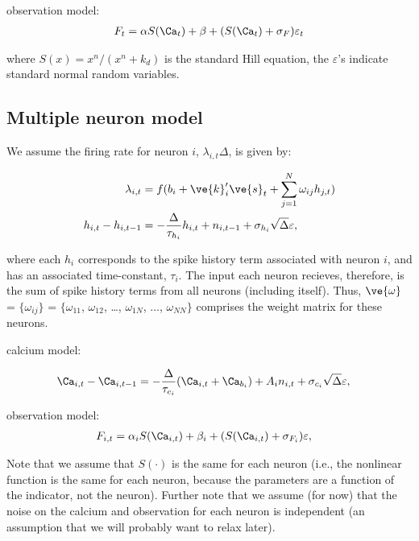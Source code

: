 \documentclass[12pt]{article}
\begin{document}
observation model:
\begin{align} \label{eq:1obs}
F_t = \alpha S(\Ca_t) + \beta + (S(\Ca_t)+\sigma_F) \varepsilon_t
\end{align} 

\noindent where $S(x)=x^n/(x^n+k_d)$ is the standard Hill equation,  the $\varepsilon$'s indicate standard normal random variables.


\subsection{Multiple neuron model} \label{sec:popmod}

We assume the firing rate for neuron $i$, $\lambda_{i,t} \Delta$, is given by:

\begin{align} \label{eq:poisson}
\lambda_{i,t} &= f(b_i + \ve{k}_i'\ve{s}_t + \sum_{j=1}^N \omega_{ij} h_{j,t}) \\
h_{i,t}-h_{i,t-1} &= -\frac{\Delta}{\tau_{h_i}} h_{i,t} + n_{i,t-1}  + \sigma_{h_i} \sqrt{\Delta} \varepsilon,
\end{align} 

\noindent where each $h_{i}$ corresponds to the spike history term associated with neuron $i$, and has an associated time-constant, $\tau_i$.  The input each neuron recieves, therefore, is the sum of spike history terms from all neurons (including itself).  Thus, $\ve{\omega}$ = $\{\omega_{ij}\}$ = $\{\omega_{11}$, $\omega_{12}$, \ldots, $\omega_{1N}$, $\ldots$, $\omega_{NN}\}$ comprises the weight matrix for these neurons.

calcium model:

\begin{align}
\Ca_{i,t} - \Ca_{i,t-1}&= -\frac{\Delta}{\tau_{c_i}} (\Ca_{i,t} + \Ca_{b_i}) + A_i n_{i,t} + \sigma_{c_i} \sqrt{\Delta} \varepsilon, 
\end{align}

observation model:
\begin{align} \label{eq:2obs}
F_{i,t} &= \alpha_i S(\Ca_{i,t}) + \beta_i + (S(\Ca_{i,t}) + \sigma_{F_i}) \varepsilon,
\end{align} 

Note that we assume that $S(\cdot)$ is the same for each neuron (i.e., the nonlinear function is the same for each neuron, because the parameters are a function of the indicator, not the neuron).  Further note that we assume (for now) that the noise on the calcium and observation for each neuron is independent (an assumption that we will probably want to relax later).
\end{document}
